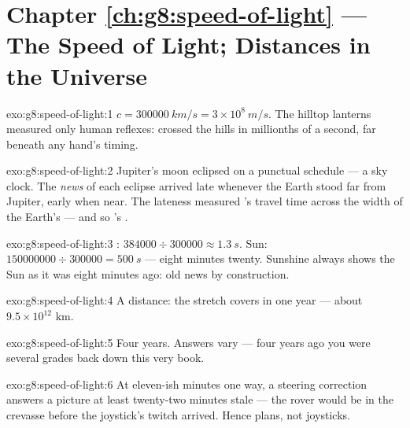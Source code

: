\section*{Chapter \ref{ch:g8:speed-of-light} --- The Speed of Light; Distances in the Universe}

\begin{solution}{exo:g8:speed-of-light:1}
$c = \qty{300000}{km/s} = 3 \times 10^{8}\ \unit{m/s}$. The
hilltop lanterns measured only human reflexes:  crossed
the hills in millionths of a second, far beneath any hand's
timing.
\end{solution}

\begin{solution}{exo:g8:speed-of-light:2}
Jupiter's moon eclipsed on a punctual schedule --- a sky
clock. The \emph{news} of each eclipse arrived late whenever
the Earth stood far from Jupiter, early when near. The
lateness measured 's travel time across the width of the
Earth's  --- and so 's .
\end{solution}

\begin{solution}{exo:g8:speed-of-light:3}
: $384000 \div 300000 \approx \qty{1.3}{s}$. Sun:
$150000000 \div 300000 = \qty{500}{s}$ --- eight minutes
twenty. Sunshine always shows the Sun as it was eight minutes
ago: old news by construction.
\end{solution}

\begin{solution}{exo:g8:speed-of-light:4}
A distance: the stretch  covers in one year --- about
$9.5 \times 10^{12}$ km.
\end{solution}

\begin{solution}{exo:g8:speed-of-light:5}
Four years. Answers vary --- four years ago you were several
grades back down this very book.
\end{solution}

\begin{solution}{exo:g8:speed-of-light:6}
At eleven-ish minutes one way, a steering correction answers a
picture at least twenty-two minutes stale --- the rover would
be in the crevasse before the joystick's twitch arrived. Hence
plans, not joysticks.
\end{solution}

